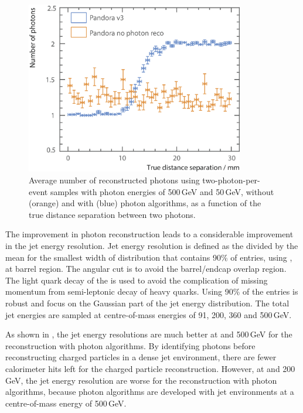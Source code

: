 \begin{figure}[!tbph]
\centering
\includegraphics[width=0.85\textwidth]{photon/nPhotonVSnoPhotonReco3}
\caption[Average number of photons using two photons of 500 and 50\,GeV per event sample.]
{Average number of reconstructed  photons using two-photon-per-event samples with photon energies of  500\,GeV and 50\,GeV, without (orange) and with (blue) photon algorithms, as a function of the true distance separation between two photons.}
\label{fig:photonDoublePerformanceNoReco}
\end{figure}




The improvement in photon reconstruction leads to a considerable improvement in the jet energy resolution. Jet energy resolution is defined as the \rms divided by the mean for the smallest width of distribution that contains 90\% of entries, using \eeZuds, at barrel region. The angular cut is to avoid the barrel/endcap overlap region. The light quark decay of the \Zprime is used   to avoid the complication of missing momentum from semi-leptonic decay of heavy quarks. Using 90\% of the entries is robust and focus on the Gaussian part of the jet energy distribution. The total jet energies are   sampled at centre-of-mass energies of 91, 200, 360 and 500\,GeV.

As shown in , the jet energy resolutions are much better at  and 500\,GeV for the reconstruction with photon algorithms. By identifying photons before reconstructing charged particles in a dense jet environment, there are fewer calorimeter hits left for the charged particle reconstruction. However, at  and 200\,GeV, the jet energy resolution are worse  for the reconstruction with photon algorithms, because photon algorithms are developed with  jet environments at a centre-of-mass energy of 500\,GeV.

